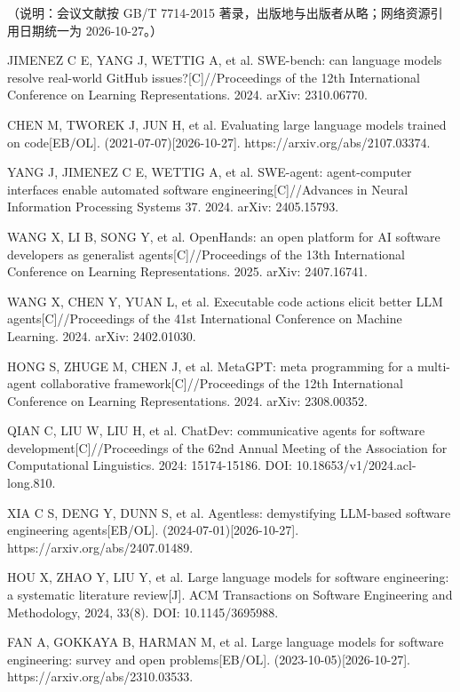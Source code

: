 （说明：会议文献按 GB/T 7714-2015 著录，出版地与出版者从略；网络资源引用日期统一为 2026-10-27。）

{\linespread{1}\selectfont
\begin{tjreflist}
\item JIMENEZ C E, YANG J, WETTIG A, et al. SWE-bench: can language models resolve real-world GitHub issues?[C]//Proceedings of the 12th International Conference on Learning Representations. 2024. arXiv: 2310.06770.
\item CHEN M, TWOREK J, JUN H, et al. Evaluating large language models trained on code[EB/OL]. (2021-07-07)[2026-10-27]. https://arxiv.org/abs/2107.03374.
\item YANG J, JIMENEZ C E, WETTIG A, et al. SWE-agent: agent-computer interfaces enable automated software engineering[C]//Advances in Neural Information Processing Systems 37. 2024. arXiv: 2405.15793.
\item WANG X, LI B, SONG Y, et al. OpenHands: an open platform for AI software developers as generalist agents[C]//Proceedings of the 13th International Conference on Learning Representations. 2025. arXiv: 2407.16741.
\item WANG X, CHEN Y, YUAN L, et al. Executable code actions elicit better LLM agents[C]//Proceedings of the 41st International Conference on Machine Learning. 2024. arXiv: 2402.01030.
\item HONG S, ZHUGE M, CHEN J, et al. MetaGPT: meta programming for a multi-agent collaborative framework[C]//Proceedings of the 12th International Conference on Learning Representations. 2024. arXiv: 2308.00352.
\item QIAN C, LIU W, LIU H, et al. ChatDev: communicative agents for software development[C]//Proceedings of the 62nd Annual Meeting of the Association for Computational Linguistics. 2024: 15174-15186. DOI: 10.18653/v1/2024.acl-long.810.
\item XIA C S, DENG Y, DUNN S, et al. Agentless: demystifying LLM-based software engineering agents[EB/OL]. (2024-07-01)[2026-10-27]. https://arxiv.org/abs/2407.01489.
\item HOU X, ZHAO Y, LIU Y, et al. Large language models for software engineering: a systematic literature review[J]. ACM Transactions on Software Engineering and Methodology, 2024, 33(8). DOI: 10.1145/3695988.
\item FAN A, GOKKAYA B, HARMAN M, et al. Large language models for software engineering: survey and open problems[EB/OL]. (2023-10-05)[2026-10-27]. https://arxiv.org/abs/2310.03533.

\end{tjreflist}}
